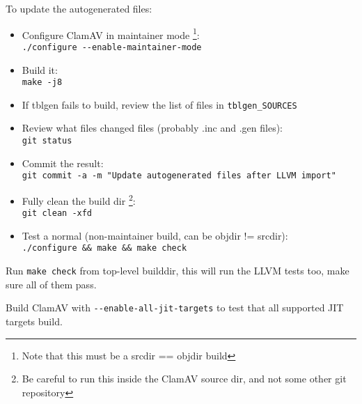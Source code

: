 To update the autogenerated files:
\begin{itemize}
\item Configure ClamAV in maintainer mode
\footnote{Note that this must be a srcdir == objdir build}:\\
\verb|./configure --enable-maintainer-mode|
\item Build it:\\
\verb|make -j8|
\item If tblgen fails to build, review the list of files in
\verb+tblgen_SOURCES+
\item Review what files changed files (probably .inc and .gen files):\\
\verb|git status|
\item Commit the result:\\
\verb|git commit -a -m "Update autogenerated files after LLVM import"|
\item Fully clean the build dir
\footnote{Be careful to run this inside the ClamAV source dir, and not some other git repository}:\\
\verb|git clean -xfd|
\item Test a normal (non-maintainer build, can be objdir != srcdir):\\
\verb|./configure && make && make check|
\end{itemize}

Run \verb+make check+ from top-level builddir, this will run the LLVM tests too,
make sure all of them pass.

Build ClamAV with \verb+--enable-all-jit-targets+ to test that all supported JIT
targets build.
